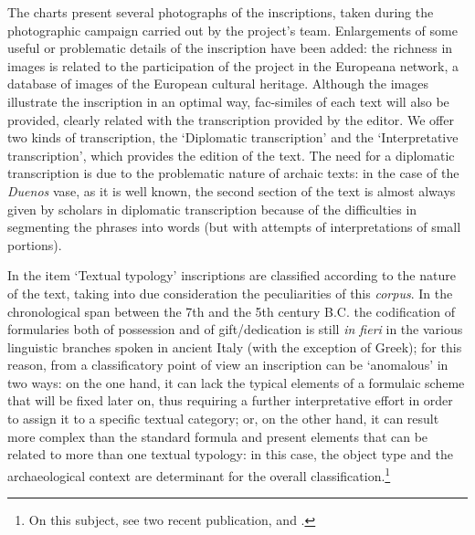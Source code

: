 \documentclass[amsthm,ebook]{saparticle}
\begin{document}
The charts present several photographs of the inscriptions, taken during the photographic campaign carried out by the
project's team. Enlargements of some useful or problematic details of the inscription have been added: the richness in
images is related to the participation of the project in the Europeana network, a database of images of the European
cultural heritage. Although the images illustrate the inscription in an optimal way, fac-similes of each text will also
be provided, clearly related with the transcription provided by the editor. 
\newpage
We offer two kinds of transcription, the ‘Diplomatic transcription' and the ‘Interpretative transcription', which
provides the edition of the text. The need for a diplomatic transcription is due to the problematic nature of archaic
texts: in the case of the \emph{Duenos} vase, as it is well known, the second section of the text is almost always given by
scholars in diplomatic transcription because of the difficulties in segmenting the phrases into words (but with
attempts of interpretations of small portions). 

In the item `Textual typology' inscriptions are classified according to the nature of the text, taking into due
consideration the peculiarities of this \emph{corpus}. In the chronological span between the 7th and the 5th century B.C. the
codification of formularies both of possession and of gift/dedication is still \emph{in fieri} in the various linguistic
branches spoken in ancient Italy (with the exception of Greek); for this reason, from a classificatory point of view an
inscription can be ‘anomalous' in two ways: on the one hand, it can lack the typical elements of a formulaic scheme
that will be fixed later on, thus requiring a further interpretative effort in order to assign it to a specific textual
category; or, on the other hand, it can result more complex than the standard formula and present elements that can be
related to more than one textual typology: in this case, the object type and the archaeological context are determinant
for the overall classification.\footnote{On this subject, see two recent publication, \citet{poccetti_paradigmi_2009} and \citet{maras_storie_2015}.} 
\end{document}
